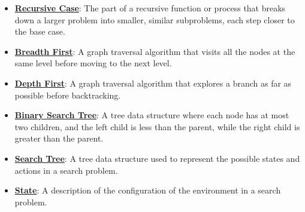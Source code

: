 \documentclass{article}%
\begin{document}
\begin{itemize}[leftmargin=*]
\item \href{https://purdue.brightspace.com/d2l/common/assets/pdfjs-d2l-dist/1.0.14-legacy/web/viewer.html?file=%2Fcontent%2Fenforced%2F1095467-wl.202510.CS.24300.001%2F14L1-DepthFS.pdf%3Fou%3D1095467&lang=en-us&container=d2l-fileviewer-rendered-pdf&fullscreen=d2l-fileviewer-rendered-pdf-dialog&height=667#page=5}{\textbf{Recursive Case}}: The part of a recursive function or process that breaks down a larger problem into smaller, similar subproblems, each step closer to the base case.%
\item \href{https://purdue.brightspace.com/d2l/common/assets/pdfjs-d2l-dist/1.0.14-legacy/web/viewer.html?file=%2Fcontent%2Fenforced%2F1095467-wl.202510.CS.24300.001%2F14L1-DepthFS.pdf%3Fou%3D1095467&lang=en-us&container=d2l-fileviewer-rendered-pdf&fullscreen=d2l-fileviewer-rendered-pdf-dialog&height=667#page=8}{\textbf{Breadth First}}: A graph traversal algorithm that visits all the nodes at the same level before moving to the next level.%
\item \href{https://purdue.brightspace.com/d2l/common/assets/pdfjs-d2l-dist/1.0.14-legacy/web/viewer.html?file=%2Fcontent%2Fenforced%2F1095467-wl.202510.CS.24300.001%2F14L1-DepthFS.pdf%3Fou%3D1095467&lang=en-us&container=d2l-fileviewer-rendered-pdf&fullscreen=d2l-fileviewer-rendered-pdf-dialog&height=667#page=8}{\textbf{Depth First}}: A graph traversal algorithm that explores a branch as far as possible before backtracking.%
\item \href{https://purdue.brightspace.com/d2l/common/assets/pdfjs-d2l-dist/1.0.14-legacy/web/viewer.html?file=%2Fcontent%2Fenforced%2F1095467-wl.202510.CS.24300.001%2F14L1-DepthFS.pdf%3Fou%3D1095467&lang=en-us&container=d2l-fileviewer-rendered-pdf&fullscreen=d2l-fileviewer-rendered-pdf-dialog&height=667#page=9}{\textbf{Binary Search Tree}}: A tree data structure where each node has at most two children, and the left child is less than the parent, while the right child is greater than the parent.%
\item \href{https://purdue.brightspace.com/d2l/common/assets/pdfjs-d2l-dist/1.0.14-legacy/web/viewer.html?file=%2Fcontent%2Fenforced%2F1095467-wl.202510.CS.24300.001%2F14L1-DepthFS.pdf%3Fou%3D1095467&lang=en-us&container=d2l-fileviewer-rendered-pdf&fullscreen=d2l-fileviewer-rendered-pdf-dialog&height=667#page=11}{\textbf{Search Tree}}: A tree data structure used to represent the possible states and actions in a search problem.%
\item \href{https://purdue.brightspace.com/d2l/common/assets/pdfjs-d2l-dist/1.0.14-legacy/web/viewer.html?file=%2Fcontent%2Fenforced%2F1095467-wl.202510.CS.24300.001%2F14L1-DepthFS.pdf%3Fou%3D1095467&lang=en-us&container=d2l-fileviewer-rendered-pdf&fullscreen=d2l-fileviewer-rendered-pdf-dialog&height=667#page=14}{\textbf{State}}: A description of the configuration of the environment in a search problem.%

\end{itemize}
\end{document}
